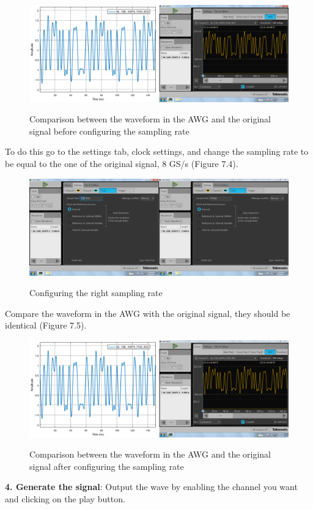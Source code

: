 \begin{figure}[h]
	\centering
	\includegraphics[width=\textwidth]{../mtools/sgnToWfm/figures/tutorial2}
	\label{TUT_CompBad}\caption{Comparison between the waveform in the AWG and the original signal before configuring the sampling rate}
\end{figure}
\bigskip
To do this go to the settings tab, clock settings, and change the sampling rate to be equal to the one of the original signal, 8 GS/s (Figure 7.4).

\begin{figure}[h]
	\centering
	\includegraphics[width=\textwidth]{../mtools/sgnToWfm/figures/tutorial3}
	\label{TUT_ConfigSR}\caption{Configuring the right sampling rate}
\end{figure}
\bigskip

Compare the waveform in the AWG with the original signal, they should be identical (Figure 7.5).

\begin{figure}[h]
	\centering
	\includegraphics[width=\textwidth]{../mtools/sgnToWfm/figures/tutorial4}
	\label{TUT_CompGood}\caption{Comparison between the waveform in the AWG and the original signal after configuring the sampling rate}
\end{figure}
\bigskip

\noindent
\textbf{4. Generate the signal}:
Output the wave by enabling the channel you want and clicking on the play button.


% 